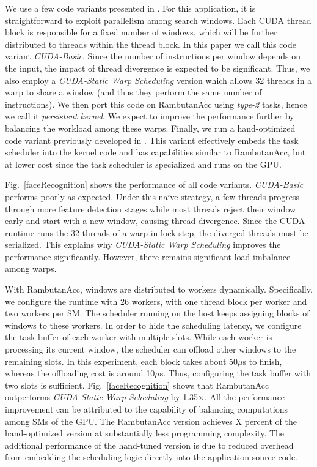 We use a few code variants presented in \cite{facedetection_dws}.
For this application, it is straightforward to exploit parallelism among search windows.
Each CUDA thread block is responsible for a fixed number of windows, which will be further distributed to threads within the thread block.
In this paper we call this code variant {\em CUDA-Basic}.
Since the number of instructions per window depends on the input, the impact of thread divergence is expected to be significant.
Thus, we also employ a {\em CUDA-Static Warp Scheduling} version which allows 32 threads in a warp to share a window (and thus they perform the same number of instructions).
We then port this code on RambutanAcc using {\em type-2} tasks, hence we call it {\em persistent kernel}.
We expect to improve the performance further by balancing the workload among these warps.
Finally, we run a hand-optimized code variant previously developed in \cite{facedetection_dws}.
This variant effectively embeds the task scheduler into the kernel code and has capabilities similar to RambutanAcc,
but at lower cost since the task scheduler is specialized and runs on the GPU.

Fig.~\ref{faceRecognition} shows the performance of all code variants.
{\em CUDA-Basic} performs poorly as expected.
Under this na{\"i}ve strategy, a few threads progress through more feature detection stages while most threads reject their window early and start with a new window, causing thread divergence.
Since the CUDA runtime runs the 32 threads of a warp in lock-step, the diverged threads must be serialized.
This explains why {\em CUDA-Static Warp Scheduling} improves the performance significantly.
However, there remains significant load imbalance among warps.

With RambutanAcc, windows are distributed to workers dynamically.
Specifically, we configure the runtime with 26 workers, with one thread block per worker and two workers per SM.
The scheduler running on the host keeps assigning blocks of windows to these workers.
In order to hide the scheduling latency, we configure the task buffer of each worker with multiple slots.
While each worker is processing its current window, the scheduler can offload other windows to the remaining slots.
In this experiment, each block takes about 50$\mu$s to finish, whereas the offloading cost is around 10$\mu$s.
Thus, configuring the task buffer with two slots is sufficient.
Fig.~\ref{faceRecognition} shows that RambutanAcc outperforms {\em CUDA-Static Warp Scheduling} by 1.35$\times$.
All the performance improvement can be attributed to the capability of balancing computations among SMs of the GPU.
The RambutanAcc version achieves X percent of the hand-optimized version at substantially less programming complexity.
The additional performance of the hand-tuned version is due to reduced overhead from embedding the scheduling logic directly into the application source code.


